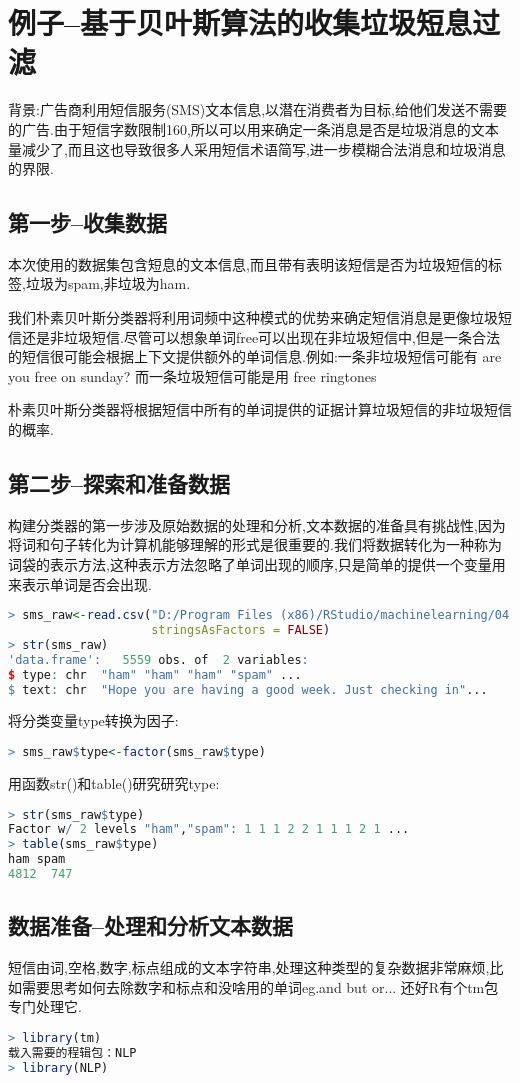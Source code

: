 \documentclass[11pt,a4paper,oneside]{book}
\begin{document}
\section{例子--基于贝叶斯算法的收集垃圾短息过滤}
背景:广告商利用短信服务(SMS)文本信息,以潜在消费者为目标,给他们发送不需要的广告.由于短信字数限制160,所以可以用来确定一条消息是否是垃圾消息的文本量减少了,而且这也导致很多人采用短信术语简写,进一步模糊合法消息和垃圾消息的界限.

\subsection{第一步--收集数据}
本次使用的数据集包含短息的文本信息,而且带有表明该短信是否为垃圾短信的标签,垃圾为spam,非垃圾为ham.

我们朴素贝叶斯分类器将利用词频中这种模式的优势来确定短信消息是更像垃圾短信还是非垃圾短信.尽管可以想象单词free可以出现在非垃圾短信中,但是一条合法的短信很可能会根据上下文提供额外的单词信息.例如:一条非垃圾短信可能有 are you free on sunday? 而一条垃圾短信可能是用 free ringtones

朴素贝叶斯分类器将根据短信中所有的单词提供的证据计算垃圾短信的非垃圾短信的概率.
\subsection{第二步--探索和准备数据}
构建分类器的第一步涉及原始数据的处理和分析,文本数据的准备具有挑战性,因为将词和句子转化为计算机能够理解的形式是很重要的.我们将数据转化为一种称为词袋的表示方法,这种表示方法忽略了单词出现的顺序,只是简单的提供一个变量用来表示单词是否会出现.

\begin{lstlisting}[language=r]
> sms_raw<-read.csv("D:/Program Files (x86)/RStudio/machinelearning/04.csv",
                    stringsAsFactors = FALSE)
> str(sms_raw)
'data.frame':	5559 obs. of  2 variables:
$ type: chr  "ham" "ham" "ham" "spam" ...
$ text: chr  "Hope you are having a good week. Just checking in"...
\end{lstlisting}
将分类变量type转换为因子:
\begin{lstlisting}[language=r]
> sms_raw$type<-factor(sms_raw$type)
\end{lstlisting}
用函数str()和table()研究研究type:
\begin{lstlisting}[language=r]
> str(sms_raw$type)
Factor w/ 2 levels "ham","spam": 1 1 1 2 2 1 1 1 2 1 ...
> table(sms_raw$type)
ham spam 
4812  747 
\end{lstlisting}
\subsection{数据准备--处理和分析文本数据}
短信由词,空格,数字,标点组成的文本字符串,处理这种类型的复杂数据非常麻烦,比如需要思考如何去除数字和标点和没啥用的单词eg.and but or...  还好R有个tm包专门处理它.
\begin{lstlisting}[language=r]
> library(tm)
载入需要的程辑包：NLP
> library(NLP)
\end{lstlisting}
\end{document}
